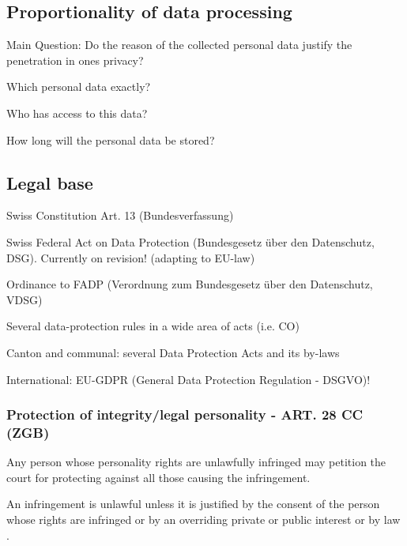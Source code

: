 \subsection{Proportionality of data processing}
Main Question: Do the reason of the collected personal data justify the penetration in ones privacy?
\begin{compactitem}	
	\item Which personal data exactly?
	\item Who has access to this data?
	\item How long will the personal data be stored?
\end{compactitem}

\subsection{Legal base}
\begin{compactitem}
	\item Swiss Constitution Art. 13 (Bundesverfassung)
	\item Swiss Federal Act on Data Protection (Bundesgesetz über den Datenschutz, DSG). Currently on revision! (adapting to EU-law)
	\item Ordinance to FADP (Verordnung zum Bundesgesetz über den Datenschutz, VDSG)
	\item Several data-protection rules in a wide area of acts (i.e. CO)
	\item Canton and communal: several Data Protection Acts and its by-laws
	\item International: EU-GDPR (General Data Protection Regulation - DSGVO)!
\end{compactitem}

\subsubsection{Protection of integrity/legal personality - ART. 28 CC (ZGB)}
\begin{compactenum}
	\item Any person whose personality rights are unlawfully infringed may petition the court for protecting against all those causing the infringement.
	\item An infringement is unlawful unless it is justified by the consent of the person whose rights are infringed or by an overriding private or public interest or by law .
\end{compactenum}

